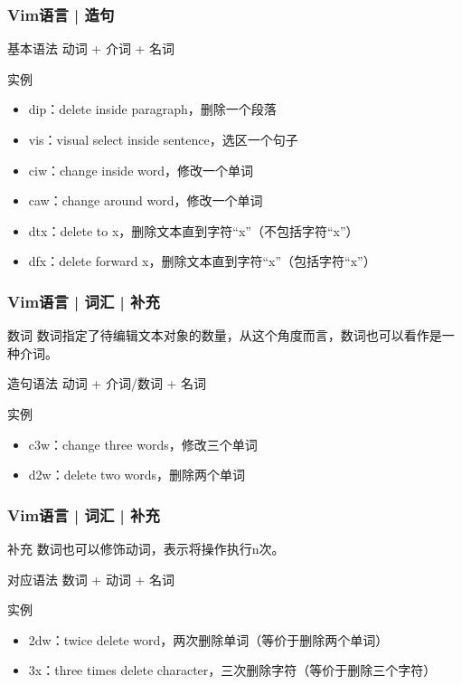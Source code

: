 \begin{frame}
  \frametitle{Vim语言 | 造句}
  \begin{block}{基本语法}
  动词 + 介词 + 名词
  \end{block}
  \pause
  \begin{block}{实例}
    \begin{itemize}
      \item dip：delete inside paragraph，删除一个段落
      \item vis：visual select inside sentence，选区一个句子
      \item ciw：change inside word，修改一个单词
      \item caw：change around word，修改一个单词
      \item dtx：delete to x，删除文本直到字符“x”（不包括字符“x”）
      \item dfx：delete forward x，删除文本直到字符“x”（包括字符“x”）
    \end{itemize}
  \end{block}
\end{frame}

\begin{frame}
  \frametitle{Vim语言 | 词汇 | 补充}
  \begin{block}{数词}
    数词指定了待编辑文本对象的数量，从这个角度而言，数词也可以看作是一种介词。
  \end{block}
  \pause
  \begin{block}{造句语法}
  动词 + 介词/数词 + 名词
  \end{block}
  \pause
  \begin{block}{实例}
    \begin{itemize}
      \item c3w：change three words，修改三个单词
      \item d2w：delete two words，删除两个单词
    \end{itemize}
  \end{block}
\end{frame}

\begin{frame}
  \frametitle{Vim语言 | 词汇 | 补充}
  \begin{block}{补充}
    数词也可以修饰动词，表示将操作执行n次。
  \end{block}
  \pause
  \begin{block}{对应语法}
  数词 + 动词 + 名词
  \end{block}
  \pause
  \begin{block}{实例}
    \begin{itemize}
      \item 2dw：twice delete word，两次删除单词（等价于删除两个单词）
      \item 3x：three times delete character，三次删除字符（等价于删除三个字符）
    \end{itemize}
  \end{block}
\end{frame}

